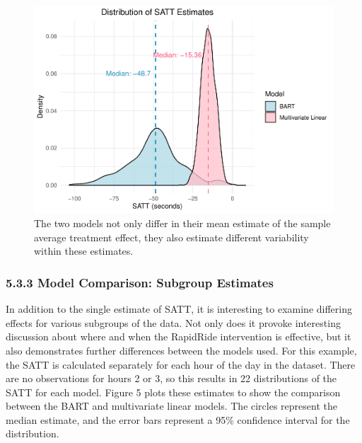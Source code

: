 \documentclass[
  12pt,
]{article}
\begin{document}
\begin{figure}

{\centering \includegraphics[width=0.7\linewidth]{figures/unnamed-chunk-14-1} 

}

\caption{The two models not only differ in their mean estimate of the sample average treatment effect, they also estimate different variability within these estimates.}\label{fig:unnamed-chunk-14}
\end{figure}

\subsubsection{5.3.3 Model Comparison: Subgroup
Estimates}\label{model-comparison-subgroup-estimates}

In addition to the single estimate of SATT, it is interesting to examine
differing effects for various subgroups of the data. Not only does it
provoke interesting discussion about where and when the RapidRide
intervention is effective, but it also demonstrates further differences
between the models used. For this example, the SATT is calculated
separately for each hour of the day in the dataset. There are no
observations for hours 2 or 3, so this results in 22 distributions of
the SATT for each model. Figure 5 plots these estimates to show the
comparison between the BART and multivariate linear models. The circles
represent the median estimate, and the error bars represent a 95\%
confidence interval for the distribution.
\end{document}
